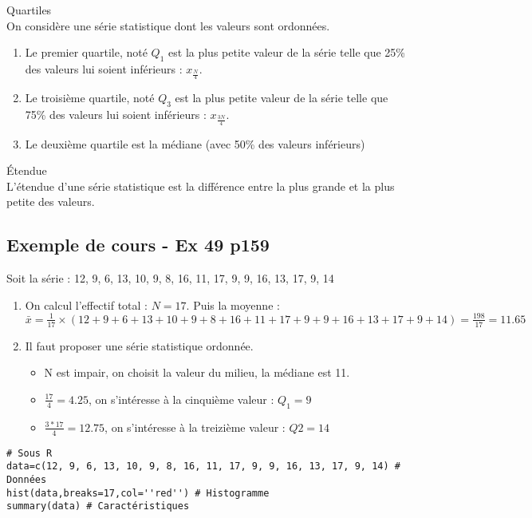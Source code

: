 \documentclass[paper=a4, fontsize=9pt]{scrartcl} %
\begin{document}
\begin{Definition}Quartiles\\
  On considère une série statistique dont les valeurs sont ordonnées.

  \begin{enumerate}
  \item Le premier quartile, noté $Q_1$ est la plus petite valeur de la série telle que 25\% des valeurs lui soient inférieurs : $x_\frac{N}{4}$.
  \item Le troisième quartile, noté $Q_3$ est la plus petite valeur de la série telle que 75\% des valeurs lui soient inférieurs : $x_\frac{3N}{4}$.
  \item Le deuxième quartile est la médiane (avec 50\% des valeurs inférieurs)
  \end{enumerate}
\end{Definition}

\begin{Definition}Étendue\\
  L'étendue d'une série statistique est la différence entre la plus grande et la plus petite des valeurs.
\end{Definition}

\subsection{Exemple de cours - Ex 49 p159}
\begin{multicols}{2}
  Soit la série : 12, 9, 6, 13, 10, 9, 8, 16, 11, 17, 9, 9, 16, 13, 17, 9, 14
  \begin{enumerate}
  \item On calcul l'effectif total : $N = 17$. Puis la moyenne : $\bar{x}  = \frac{1}{17} \times (12+9+6+13+10+9+8+16+11+17+9+9+16+13+17+9+14) = \frac{198}{17} = 11.65$ 
  \item Il faut proposer une série statistique ordonnée.
    \begin{itemize}
    \item N est impair, on choisit la valeur du milieu, la médiane est 11.
    \item $\frac{17}{4} = 4.25$, on s'intéresse à la cinquième valeur : $Q_1 = 9$
    \item $\frac{3*17}{4} = 12.75$, on s'intéresse à la treizième valeur : $Q2 = 14$
    \end{itemize}
  \end{enumerate}
\end{multicols}
\begin{verbatim}
# Sous R
data=c(12, 9, 6, 13, 10, 9, 8, 16, 11, 17, 9, 9, 16, 13, 17, 9, 14) # Données
hist(data,breaks=17,col=''red'') # Histogramme
summary(data) # Caractéristiques
\end{verbatim}
\end{document}
